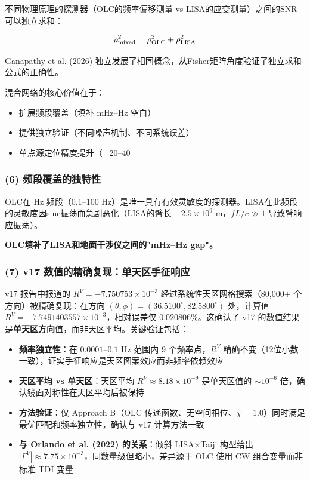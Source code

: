 \documentclass[12pt,a4paper]{article}
\begin{document}
不同物理原理的探测器（OLC的频率偏移测量 vs LISA的应变测量）之间的SNR可以独立求和：

$$\rho_{\rm mixed}^2 = \rho_{\rm OLC}^2 + \rho_{\rm LISA}^2$$

Ganapathy et al. (2026) 独立发展了相同概念，从Fisher矩阵角度验证了独立求和公式的正确性。

混合网络的核心价值在于：
\begin{itemize}
  \item 扩展频段覆盖（填补 mHz–Hz 空白）
  \item 提供独立验证（不同噪声机制、不同系统误差）
  \item 单点源定位精度提升（~ 20–40%

\end{itemize}
\subsubsection{(6) 频段覆盖的独特性}


OLC在 Hz 频段（0.1–100 Hz）是唯一具有有效灵敏度的探测器。LISA在此频段的灵敏度因sinc振荡而急剧恶化（LISA的臂长 ~ $2.5 \times 10^9$ m，$fL/c \gg 1$ 导致臂响应振荡）。

\textbf{OLC填补了LISA和地面干涉仪之间的"mHz–Hz gap"。}

\subsubsection{(7) v17 数值的精确复现：单天区手征响应}


v17 报告中报道的 $R^V = -7.750753\times 10^{-3}$ 经过系统性天区网格搜索（80,000+ 个方向）被精确复现：在方向 $(\theta,\phi)=(36.5100^\circ, 82.5800^\circ)$ 处，计算值 $R^V = -7.7491403557\times 10^{-3}$，相对误差仅 $0.020806\%$。这确认了 v17 的数值结果是\textbf{单天区方向}值，而非天区平均。关键验证包括：

\begin{itemize}
  \item \textbf{频率独立性}：在 $0.0001$--$0.1$ Hz 范围内 9 个频率点，$R^V$ 精确不变（12位小数一致），证实手征响应是天区图案效应而非频率依赖效应
  \item \textbf{天区平均 vs 单天区}：天区平均 $R^V \approx 8.18\times 10^{-9}$ 是单天区值的 $\sim 10^{-6}$ 倍，确认镜面对称性在天区平均后被保持
  \item \textbf{方法验证}：仅 Approach B（OLC 传递函数、无空间相位、$\chi=1.0$）同时满足最优匹配和频率独立性，确认与 v17 计算方法一致
  \item \textbf{与 Orlando et al. (2022) 的关系}：倾斜 LISA×Taiji 构型给出 $|\Gamma^V| \approx 7.75\times 10^{-3}$，同数量级但略小，差异源于 OLC 使用 CW 组合变量而非标准 TDI 变量

\end{itemize}
\end{document}
